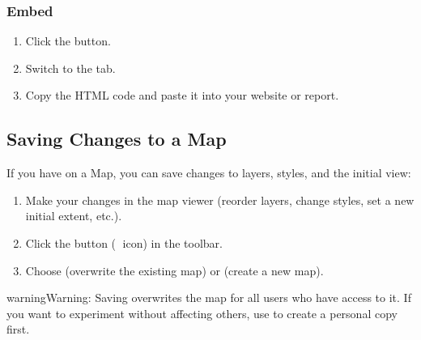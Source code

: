 \documentclass[letterpaper,10pt,english]{sphinxmanual}
\begin{document}
\subsubsection{Embed}
\label{\detokenize{en/04_exploring_maps:embed}}\begin{enumerate}
%
\item {} 
\sphinxAtStartPar
Click the  button.

\item {} 
\sphinxAtStartPar
Switch to the  tab.

\item {} 
\sphinxAtStartPar
Copy the HTML  code and paste it into your website or report.

\end{enumerate}


\subsection{Saving Changes to a Map}
\label{\detokenize{en/04_exploring_maps:saving-changes-to-a-map}}
\sphinxAtStartPar
If you have  on a Map, you can save changes to layers, styles, and
the initial view:
\begin{enumerate}
%
\item {} 
\sphinxAtStartPar
Make your changes in the map viewer (reorder layers, change styles, set a new
initial extent, etc.).

\item {} 
\sphinxAtStartPar
Click the  button (💾 icon) in the toolbar.

\item {} 
\sphinxAtStartPar
Choose  (overwrite the existing map) or  (create a new map).

\end{enumerate}

\begin{sphinxadmonition}{warning}{Warning:}
\sphinxAtStartPar
Saving overwrites the map for all users who have access to it.
If you want to experiment without affecting others, use  to create a
personal copy first.
\end{sphinxadmonition}
\end{document}

